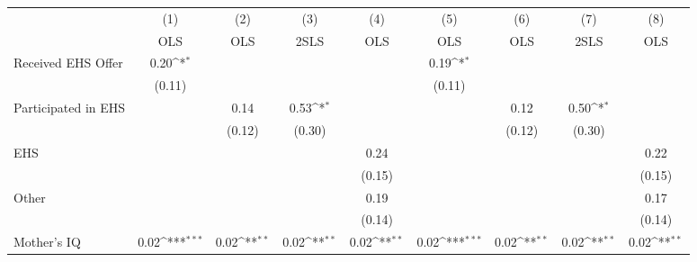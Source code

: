 {
\def\sym#1{\ifmmode^{#1}\else\(^{#1}\)\fi}
\begin{tabular}{l*{8}{c}}
\hline\hline
                    &\multicolumn{1}{c}{(1)}&\multicolumn{1}{c}{(2)}&\multicolumn{1}{c}{(3)}&\multicolumn{1}{c}{(4)}&\multicolumn{1}{c}{(5)}&\multicolumn{1}{c}{(6)}&\multicolumn{1}{c}{(7)}&\multicolumn{1}{c}{(8)}\\
                    &\multicolumn{1}{c}{OLS}&\multicolumn{1}{c}{OLS}&\multicolumn{1}{c}{2SLS}&\multicolumn{1}{c}{OLS}&\multicolumn{1}{c}{OLS}&\multicolumn{1}{c}{OLS}&\multicolumn{1}{c}{2SLS}&\multicolumn{1}{c}{OLS}\\
\hline
Received EHS Offer  &        0.20\sym{*}  &                     &                     &                     &        0.19\sym{*}  &                     &                     &                     \\
                    &      (0.11)         &                     &                     &                     &      (0.11)         &                     &                     &                     \\
[1em]
Participated in EHS &                     &        0.14         &        0.53\sym{*}  &                     &                     &        0.12         &        0.50\sym{*}  &                     \\
                    &                     &      (0.12)         &      (0.30)         &                     &                     &      (0.12)         &      (0.30)         &                     \\
[1em]
EHS                 &                     &                     &                     &        0.24         &                     &                     &                     &        0.22         \\
                    &                     &                     &                     &      (0.15)         &                     &                     &                     &      (0.15)         \\
[1em]
Other               &                     &                     &                     &        0.19         &                     &                     &                     &        0.17         \\
                    &                     &                     &                     &      (0.14)         &                     &                     &                     &      (0.14)         \\
[1em]
Mother's IQ         &        0.02\sym{***}&        0.02\sym{**} &        0.02\sym{**} &        0.02\sym{**} &        0.02\sym{***}&        0.02\sym{**} &        0.02\sym{**} &        0.02\sym{**} \\

\end{tabular}}
